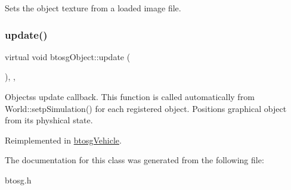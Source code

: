 Sets the object texture from a loaded image file. \mbox{\label{classbtosgObject_a342917817dfde62554f83da8e0d5110b}} 
\subsubsection{\texorpdfstring{update()}{update()}}
{\footnotesize\ttfamily virtual void btosg\+Object\+::update (\begin{DoxyParamCaption}{ }\end{DoxyParamCaption})\hspace{0.3cm}{\ttfamily [inline]}, {\ttfamily [virtual]}, {\ttfamily [inherited]}}

Objects\textquotesingle{}s update callback. This function is called automatically from World\+::setp\+Simulation() for each registered object. Positions graphical object from its physhical state. 

Reimplemented in \hyperlink{classbtosgVehicle_a5fd0f471df492ac232c9b772a28bd2b9}{btosg\+Vehicle}.



The documentation for this class was generated from the following file\+:\begin{DoxyCompactItemize}
\item 
btosg.\+h\end{DoxyCompactItemize}
